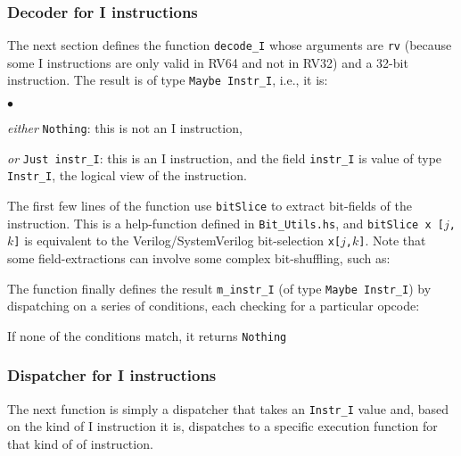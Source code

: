 \documentclass[11pt]{article}
\newenvironment{tightlist}%
{\begin{list}{$\bullet$}{%
    \setlength{\topsep}{0in}
    \setlength{\partopsep}{0in}
    \setlength{\itemsep}{0in}
    \setlength{\parsep}{0in}
    \setlength{\leftmargin}{1.5em}
    \setlength{\rightmargin}{0in}
    \setlength{\itemindent}{0in}
}
}%
{\end{list}
}
\begin{document}

\subsubsection{Decoder for I instructions}

The next section defines the function \verb|decode_I| whose arguments
are {\tt rv} (because some I instructions are only valid in RV64 and
not in RV32) and a 32-bit instruction.  The result is of type
\verb|Maybe Instr_I|, i.e., it is:

\begin{tightlist}

 \item \emph{either} \verb|Nothing|: this is not an I instruction,

 \item \emph{or} \verb|Just instr_I|: this is an I instruction, and
 the field \verb|instr_I| is value of type \verb|Instr_I|, the logical
 view of the instruction.

\end{tightlist}



The first few lines of the function use \verb|bitSlice| to extract
bit-fields of the instruction.  This is a help-function defined in
\verb|Bit_Utils.hs|, and {\tt bitSlice~x~[$j$,$k$]} is equivalent to
the Verilog/SystemVerilog bit-selection {\tt x[$j$,$k$]}.  Note that
some field-extractions can involve some complex bit-shuffling, such
as:



The function finally defines the result \verb|m_instr_I| (of type
\verb|Maybe Instr_I|) by dispatching on a series of conditions, each
checking for a particular opcode:



If none of the conditions match, it returns \verb|Nothing|



\subsubsection{Dispatcher for I instructions}

The next function is simply a dispatcher that takes an \verb|Instr_I|
value and, based on the kind of I instruction it is, dispatches to a
specific execution function for that kind of of instruction.
\end{document}
